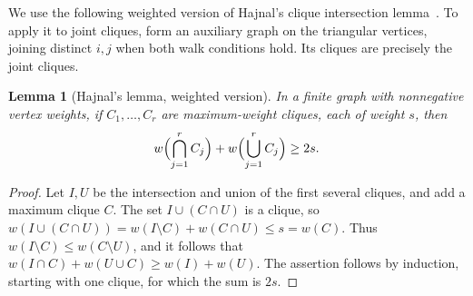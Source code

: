 \documentclass[10pt]{article}
\newtheorem{lem}[thm]{Lemma}
\theoremstyle{remark}
\begin{document}
We use the following weighted version of Hajnal's clique intersection lemma~\cite{Hajnal}. To apply it to joint cliques, form an auxiliary graph on the triangular vertices, joining distinct $i,j$ when both walk conditions hold. Its cliques are precisely the joint cliques.

\begin{lem}[Hajnal's lemma, weighted version]\label{lem:hajnal}
In a finite graph with nonnegative vertex weights, if $C_1,\ldots,C_r$ are maximum-weight cliques, each of weight $s$, then
\[
 w\Bigl(\bigcap_{j=1}^r C_j\Bigr)
 +w\Bigl(\bigcup_{j=1}^r C_j\Bigr)\ge 2s.
\]
\end{lem}
\begin{proof}
Let $I,U$ be the intersection and union of the first several cliques, and add a maximum clique $C$. The set $I\cup(C\cap U)$ is a clique, so $w(I\cup(C\cap U))=w(I\setminus C)+w(C\cap U)\le s=w(C)$. Thus $w(I\setminus C)\le w(C\setminus U)$, and it follows that $w(I\cap C)+w(U\cup C)\ge w(I)+w(U)$. The assertion follows by induction, starting with one clique, for which the sum is $2s$.
\end{proof}
\end{document}
